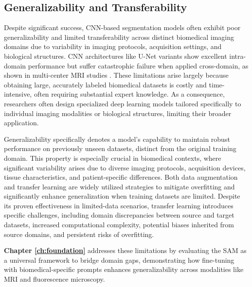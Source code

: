 \documentclass[./dissertation.tex]{subfiles}
\begin{document}
\subsection{Generalizability and Transferability}

Despite significant success, CNN-based segmentation models often exhibit poor generalizability and limited transferability across distinct biomedical imaging domains due to variability in imaging protocols, acquisition settings, and biological structures. CNN architectures like U-Net variants show excellent intra-domain performance but suffer catastrophic failure when applied cross-domain, as shown in multi-center MRI studies \cite{de2023domain}. These limitations arise largely because obtaining large, accurately labeled biomedical datasets is costly and time-intensive, often requiring substantial expert knowledge. As a consequence, researchers often design specialized deep learning models tailored specifically to individual imaging modalities or biological structures, limiting their broader application.

Generalizability specifically denotes a model's capability to maintain robust performance on previously unseen datasets, distinct from the original training domain. This property is especially crucial in biomedical contexts, where significant variability arises due to diverse imaging protocols, acquisition devices, tissue characteristics, and patient-specific differences. Both data augmentation and transfer learning are widely utilized strategies to mitigate overfitting and significantly enhance generalization when training datasets are limited. Despite its proven effectiveness in limited-data scenarios, transfer learning introduces specific challenges, including domain discrepancies between source and target datasets, increased computational complexity, potential biases inherited from source domains, and persistent risks of overfitting.

\textbf{Chapter \ref{ch:foundation}} addresses these limitations by evaluating the SAM \cite{kirillov2023segment} as a universal framework to bridge domain gaps, demonstrating how fine-tuning with biomedical-specific prompts enhances generalizability across modalities like MRI and fluorescence microscopy.
\end{document}
